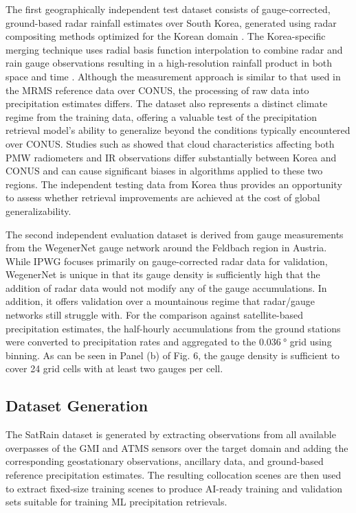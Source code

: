 \documentclass[11pt]{article}
\begin{document}
The first geographically independent test dataset consists of gauge-corrected,
ground-based radar rainfall estimates over South Korea, generated using radar
compositing methods optimized for the Korean domain
\citep{Kwon2015RadarComparison}. The Korea-specific merging technique uses
radial basis function interpolation to combine radar and rain gauge observations
resulting in a high-resolution rainfall product in both space and time
\citep{Ryu2025RBFMerging}. Although the measurement approach is similar to that
used in the MRMS reference data over CONUS, the processing of raw data into
precipitation estimates differs. The dataset also represents a distinct climate
regime from the training data, offering a valuable test of the precipitation
retrieval model’s ability to generalize beyond the conditions typically
encountered over CONUS. Studies such as \cite{Sohn2013WarmRain} showed that
cloud characteristics affecting both PMW radiometers and IR observations differ
substantially between Korea and CONUS and can cause significant biases in
algorithms applied to these two regions. The independent testing data from Korea
thus provides an opportunity to assess whether retrieval improvements are
achieved at the cost of global generalizability.

The second independent evaluation dataset is derived from gauge measurements
from the WegenerNet \citep{Fuchsberger2021WegenerNet} gauge network around the
Feldbach region in Austria. While IPWG focuses primarily on gauge-corrected
radar data for validation, WegenerNet is unique in that its gauge density is
sufficiently high that the addition of radar data would not modify any of the
gauge accumulations. In addition, it offers validation over a mountainous regime
that radar/gauge networks still struggle with. For the comparison against
satellite-based precipitation estimates, the half-hourly accumulations from the
ground stations were converted to precipitation rates and aggregated to the
$\SI{0.036}{\degree}$ grid using binning. As can be seen in Panel (b) of Fig. 6,
the gauge density is sufficient to cover 24 grid cells with at least two gauges
per cell.


\subsection{Dataset Generation}

The SatRain dataset is generated by extracting observations from all available
overpasses of the GMI and ATMS sensors over the target domain and adding the
corresponding geostationary observations, ancillary data, and ground-based
reference precipitation estimates. The resulting collocation scenes are then
used to extract fixed-size training scenes to produce AI-ready training and
validation sets suitable for training ML precipitation retrievals.
\end{document}
